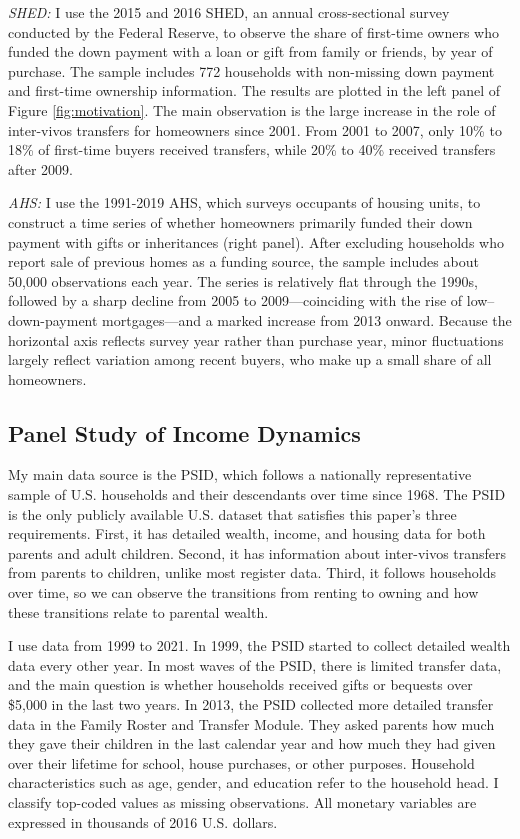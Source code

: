 \documentclass[12pt]{article}
\begin{document}
\textit{SHED:} I use the 2015 and 2016 SHED, an annual cross-sectional survey conducted by the Federal Reserve, to observe the share of first-time owners who funded the down payment with a loan or gift from family or friends, by year of purchase. The sample includes 772 households with non-missing down payment and first-time ownership information. The results are plotted in the left panel of Figure \ref{fig:motivation}. The main observation is the large increase in the role of inter-vivos transfers for homeowners since 2001. From 2001 to 2007, only 10\% to 18\% of first-time buyers received transfers, while 20\% to 40\% received transfers after 2009.

\textit{AHS:} I use the 1991-2019 AHS, which surveys occupants of housing units, to construct a time series of whether homeowners primarily funded their down payment with gifts or inheritances (right panel). After excluding households who report sale of previous homes as a funding source, the sample includes about 50,000 observations each year. The series is relatively flat through the 1990s, followed by a sharp decline from 2005 to 2009---coinciding with the rise of low–down-payment mortgages---and a marked increase from 2013 onward. Because the horizontal axis reflects survey year rather than purchase year, minor fluctuations largely reflect variation among recent buyers, who make up a small share of all homeowners.

\subsection{Panel Study of Income Dynamics}\label{sec:PSID}
My main data source is the PSID, which follows a nationally representative sample of U.S. households and their descendants over time since 1968. The PSID is the only publicly available U.S. dataset that satisfies this paper's three requirements. First, it has detailed wealth, income, and housing data for both parents and adult children. Second, it has information about inter-vivos transfers from parents to children, unlike most register data. Third, it follows households over time, so we can observe the transitions from renting to owning and how these transitions relate to parental wealth.

I use data from 1999 to 2021. In 1999, the PSID started to collect detailed wealth data every other year. In most waves of the PSID, there is limited transfer data, and the main question is whether households received gifts or bequests over \$5,000 in the last two years. In 2013, the PSID collected more detailed transfer data in the Family Roster and Transfer Module. They asked parents how much they gave their children in the last calendar year and how much they had given over their lifetime for school, house purchases, or other purposes. Household characteristics such as age, gender, and education refer to the household head. I classify top-coded values as missing observations. All monetary variables are expressed in thousands of 2016 U.S. dollars.
\end{document}
